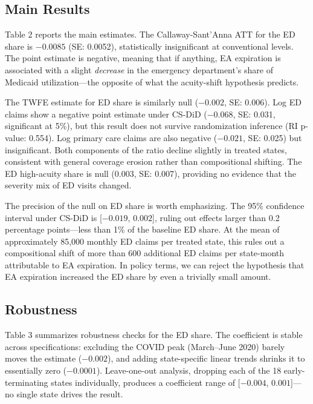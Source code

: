 \documentclass[12pt]{article}
\begin{document}
\subsection{Main Results}



Table 2 reports the main estimates. The Callaway-Sant'Anna ATT for the ED share is $-0.0085$ (SE: 0.0052), statistically insignificant at conventional levels. The point estimate is negative, meaning that if anything, EA expiration is associated with a slight \textit{decrease} in the emergency department's share of Medicaid utilization---the opposite of what the acuity-shift hypothesis predicts.

The TWFE estimate for ED share is similarly null ($-0.002$, SE: 0.006). Log ED claims show a negative point estimate under CS-DiD ($-0.068$, SE: 0.031, significant at 5\%), but this result does not survive randomization inference (RI p-value: 0.554). Log primary care claims are also negative ($-0.021$, SE: 0.025) but insignificant. Both components of the ratio decline slightly in treated states, consistent with general coverage erosion rather than compositional shifting. The ED high-acuity share is null ($0.003$, SE: 0.007), providing no evidence that the severity mix of ED visits changed.

The precision of the null on ED share is worth emphasizing. The 95\% confidence interval under CS-DiD is [$-0.019$, $0.002$], ruling out effects larger than 0.2 percentage points---less than 1\% of the baseline ED share. At the mean of approximately 85,000 monthly ED claims per treated state, this rules out a compositional shift of more than 600 additional ED claims per state-month attributable to EA expiration. In policy terms, we can reject the hypothesis that EA expiration increased the ED share by even a trivially small amount.

\subsection{Robustness}



Table 3 summarizes robustness checks for the ED share. The coefficient is stable across specifications: excluding the COVID peak (March--June 2020) barely moves the estimate ($-0.002$), and adding state-specific linear trends shrinks it to essentially zero ($-0.0001$). Leave-one-out analysis, dropping each of the 18 early-terminating states individually, produces a coefficient range of [$-0.004$, $0.001$]---no single state drives the result.
\end{document}
